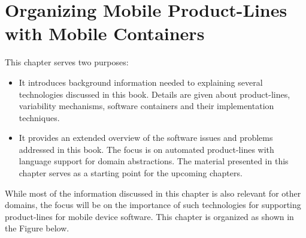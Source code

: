 

\chapter{Organizing Mobile Product-Lines with Mobile Containers}
\label{ch02}


\noindent This chapter serves two purposes:
\begin{itemize}
\item It introduces background information needed to explaining several technologies discussed in this book. Details are given about product-lines, variability mechanisms, software containers and their implementation techniques.

\item It provides an extended overview of the software issues and problems addressed in this book. The focus is on automated product-lines with language support for domain abstractions. The material presented in this chapter serves as a starting point for the upcoming chapters.

\end{itemize}

While most of the information discussed in this chapter is also relevant for other domains, the focus will be on the importance of such technologies for supporting product-lines for mobile device software. This chapter is organized as shown in the Figure below.

\begin{figure}[ht]
\end{figure}

